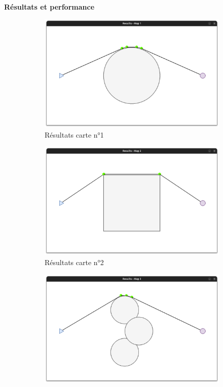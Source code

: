 \documentclass[aspectratio=169,10pt]{beamer}
\begin{document}
\begin{frame}{\textbf{Résultats et performance}}
    \begin{figure}[H]
		\centering
		\begin{subfigure}[b]{0.24\textwidth}
			\centering
			\includegraphics[width=\textwidth]{IMAGES/rmap1.png}
			\caption*{Résultats carte n°1}
			\label{fig:rmap1}
		\end{subfigure}
		\hfill
		\begin{subfigure}[b]{0.24\textwidth}
			\centering
			\includegraphics[width=\textwidth]{IMAGES/rmap2.png}
			\caption*{Résultats carte n°2}
			\label{fig:rmap2}
		\end{subfigure}
		\hfill
		\begin{subfigure}[b]{0.24\textwidth}
			\centering
			\includegraphics[width=\textwidth]{IMAGES/rmap3.png}

\end{subfigure}
\end{figure}
\end{frame}
\end{document}
